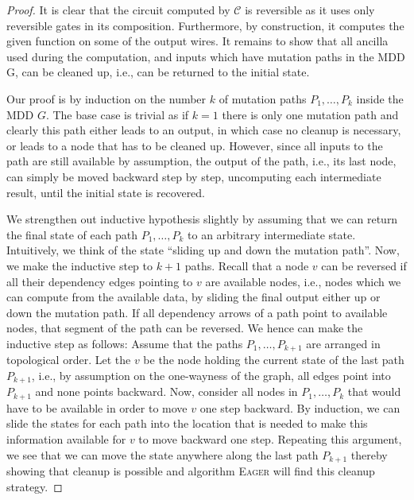 \begin{proof}

It is clear that the circuit computed by ${\mathcal C}$ is reversible as it uses
only reversible gates in its composition.  Furthermore, by construction, it
computes the given function on some of the output wires.  It remains to show
that all ancilla used during the computation, and inputs which have mutation
paths in the MDD G, can be cleaned up, i.e., can be returned to the initial
state.

Our proof is by induction on the number $k$ of mutation paths $P_1, \ldots, P_k$
inside the MDD $G$. The base case is trivial as if $k=1$ there is only one
mutation path and clearly this path either leads to an output, in which case no
cleanup is necessary, or leads to a node that has to be cleaned up. However,
since all inputs to the path are still available by assumption, the output of
the path, i.e., its last node, can simply be moved backward step by step,
uncomputing each intermediate result, until the initial state is recovered.

We strengthen out inductive hypothesis slightly by assuming that we can return
the final state of each path $P_1, \ldots, P_k$ to an arbitrary intermediate
state. Intuitively, we think of the state ``sliding up and down the mutation
path''. Now, we make the inductive step to $k+1$ paths. Recall that a node $v$
can be reversed if all their dependency edges pointing to $v$ are available
nodes, i.e., nodes which we can compute from the available data, by sliding the
final output either up or down the mutation path. If all dependency arrows of a
path point to available nodes, that segment of the path can be reversed. We
hence can make the inductive step as follows: Assume that the paths $P_1,
\ldots, P_{k+1}$ are arranged in topological order. Let the $v$ be the node
holding the current state of the last path $P_{k+1}$, i.e., by assumption on the
one-wayness of the graph, all edges point into $P_{k+1}$ and none points
backward. Now, consider all nodes in $P_1, \ldots, P_k$ that would have to be
available in order to move $v$ one step backward. By induction, we can slide the
states for each path into the location that is needed to make this information
available for $v$ to move backward one step. Repeating this argument, we see
that we can move the state anywhere along the last path $P_{k+1}$ thereby
showing that cleanup is possible and algorithm \textsc{Eager} will find this
cleanup strategy.

\end{proof}

